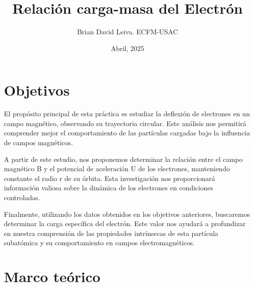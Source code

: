 \documentclass[twocolumn,a4paper,11pt]{scrartcl}
\title{Relación carga-masa del Electrón}
\author{Brian David Leiva. ECFM-USAC}
\date{Abril, 2025}
\begin{document}

\section{Objetivos}

El propósito principal de esta práctica es estudiar la deflexión de electrones en un campo magnético, observando su trayectoria circular. Este análisis nos permitirá comprender mejor el comportamiento de las partículas cargadas bajo la influencia de campos magnéticos.

A partir de este estudio, nos proponemos determinar la relación entre el campo magnético B y el potencial de aceleración U de los electrones, manteniendo constante el radio r de su órbita. Esta investigación nos proporcionará información valiosa sobre la dinámica de los electrones en condiciones controladas.

Finalmente, utilizando los datos obtenidos en los objetivos anteriores, buscaremos determinar la carga específica del electrón. Este valor  nos ayudará a profundizar en nuestra comprensión de las propiedades intrínsecas de esta partícula subatómica y su comportamiento en campos electromagnéticos.

\section{Marco teórico}
\end{document}
